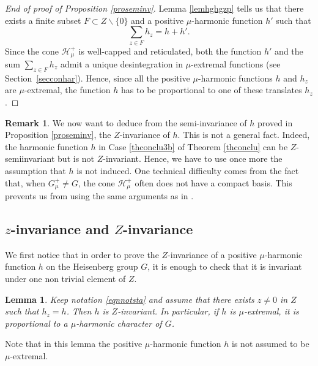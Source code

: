 \documentclass[11pt]{article}
\numberwithin{equation}{section}
\let\mathcal\mathscr
\newtheorem{Lem}[Thm]{Lemma}
\theoremstyle{definition}
\newtheorem{Rem}[Thm]{Remark}
\newcommand{\mc}[1]{\mathcal{ #1}}
\let\bq\relax
\let\eq\relax
\begin{document}
\begin{proof}[End of proof of Proposition \ref{proseminv}]
Lemma \ref{lemhghgzp} tells us that there exists a finite subset $F\subset Z\smallsetminus\{0\}$ and a positive $\mu$-harmonic function $h'$ such that
\[
\sum_{z\in F} h_z=h+h'.
\]
Since the cone $\mc H_\mu^+$ is well-capped and reticulated,
both the function $h'$ and the sum $\sum_{z\in F}h_z$ admit a unique desintegration in $\mu$-extremal functions
(see Section~\ref{secconhar}).
Hence, since all the positive $\mu$-harmonic functions $h$ and $h_z$ are $\mu$-extremal,
the function $h$ has to be proportional to one of these translates $h_z$.
\end{proof}

\begin{Rem}
We now want to deduce from the semi-invariance of $h$
proved in Proposition \ref{proseminv}, the $Z$-invariance of $h$.
This is not a general fact.
Indeed, the harmonic function $h$ in Case \eqref{thconclu3b} of Theorem \ref{thconclu}
can be $Z$-semiinvariant but is not $Z$-invariant.
Hence, we have to use once more the assumption that $h$ is not induced.
One technical difficulty comes from the fact that, when
$G^+_\mu\neq G$, the cone $\mc H_\mu^+$
often does not have a compact basis. This prevents us from using
the same arguments as in \cite{Margulis66}.
\end{Rem}

\subsection{$z$-invariance and $Z$-invariance}
\label{seczinzin}

\bq
We first notice that in order to prove the $Z$-invariance
of a positive $\mu$-harmonic function $h$ on the Heisenberg group $G$, it is enough
to check that it is invariant under one non trivial element of $Z$.
\eq

\begin{Lem}
\label{lemzinzin}
Keep notation \eqref{eqnnotsta} and
assume that there exists $z\neq 0$ in $Z$ such that
$h_z=h$. Then $h$ is $Z$-invariant.
In particular, if $h$ is $\mu$-extremal, it is proportional to a $\mu$-harmonic character of $G$.
\end{Lem}

Note that in this lemma the positive $\mu$-harmonic function $h$
is not assumed to be $\mu$-extremal.
\end{document}

